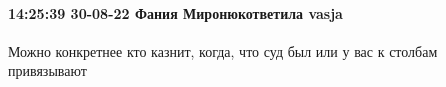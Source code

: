 
 
 
 
 

\paragraph{14:25:39 30-08-22 Фания Миронюкответила vasja}

Можно конкретнее кто казнит, когда, что суд был или у вас к столбам привязывают
